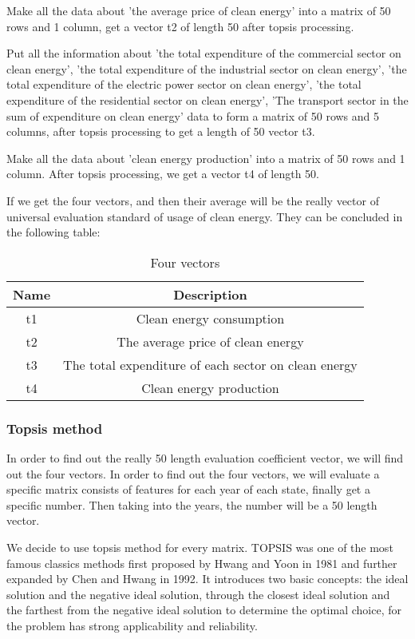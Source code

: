\documentclass[a4paper]{article}
\begin{document}
Make all the data about 'the average price of clean energy' into a matrix of 50 rows and 1 column, get a vector t2 of length 50 after topsis processing.

 Put all the information about 'the total expenditure of the commercial sector on clean energy', 'the total expenditure of the industrial sector on clean energy', 'the total expenditure of the electric power sector on clean energy', 'the total expenditure of the residential sector on clean energy', 'The transport sector in the sum of expenditure on clean energy' data to form a matrix of 50 rows and 5 columns, after topsis processing to get a length of 50 vector t3.
 
Make all the data about 'clean energy production' into a matrix of 50 rows and 1 column. After topsis processing, we get a vector t4 of length 50.

If we get the four vectors, and then their average will be the really vector of universal evaluation standard of usage of clean energy. They can be concluded in the following table:

\begin{table}[!htbp]
\centering
\begin{tabular}{cc}
\toprule
Name & Description\\
\midrule
t1 & Clean energy consumption\\
t2 & The average price of clean energy\\
t3 & The total expenditure of each sector on clean energy\\
t4 & Clean energy production\\
\bottomrule
\end{tabular}
\caption{Four vectors}\label{tab:aStrangeTable}
\end{table}

\subsubsection{Topsis method}

In order to find out the really 50 length evaluation coefficient vector, we will find out the four vectors. In order to find out the four vectors, we will evaluate a specific matrix consists of features for each year of each state, finally get a specific number. Then taking into the years, the number will be a 50 length vector.

We decide to use topsis method for every matrix.\cite{topsis} TOPSIS was one of the most famous classics methods first proposed by Hwang and Yoon in 1981 and further expanded by Chen and Hwang in 1992. It introduces two basic concepts: the ideal solution and the negative ideal solution, through the closest ideal solution and the farthest from the negative ideal solution to determine the optimal choice, for the problem has strong applicability and reliability.
\end{document}
